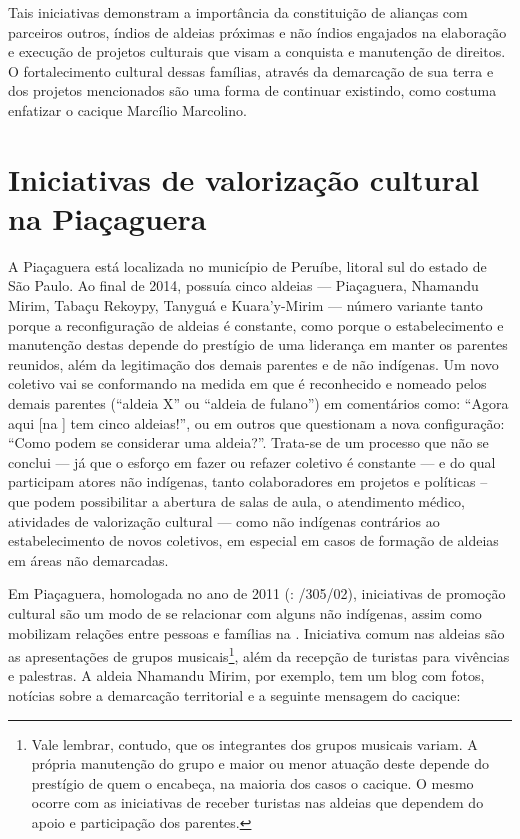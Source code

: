 Tais iniciativas demonstram a importância da constituição de alianças
com parceiros outros, índios de aldeias próximas e não índios engajados
na elaboração e execução de projetos culturais que visam a conquista e
manutenção de direitos. O fortalecimento cultural dessas famílias,
através da demarcação de sua terra e dos projetos mencionados são uma
forma de continuar existindo, como costuma enfatizar o cacique Marcílio
Marcolino.  

\section{Iniciativas de valorização cultural na  Piaçaguera}

A  Piaçaguera está localizada no município de Peruíbe, litoral sul do
estado de São Paulo. Ao final de 2014, possuía cinco aldeias —
Piaçaguera, Nhamandu Mirim, Tabaçu Rekoypy, Tanyguá e Kuara’y-Mirim —
número variante tanto porque a reconfiguração de aldeias é constante,
como porque o estabelecimento e manutenção destas depende do prestígio
de uma liderança em manter os parentes reunidos, além da legitimação
dos demais parentes e de não indígenas. Um novo coletivo vai se
conformando na medida em que é reconhecido e nomeado pelos demais
parentes (``aldeia X'' ou ``aldeia de fulano'') em comentários como: ``Agora
aqui [na ] tem cinco aldeias!'', ou em outros que questionam a nova
configuração: ``Como podem se considerar uma aldeia?''. Trata-se de um
processo que não se conclui — já que o esforço em fazer ou refazer
coletivo é constante — e do qual participam atores não indígenas, tanto
colaboradores em projetos e políticas – que podem possibilitar a
abertura de salas de aula, o atendimento médico, atividades de
valorização cultural — como não indígenas contrários ao estabelecimento
de novos coletivos, em especial em casos de formação de aldeias em
áreas não demarcadas. 

Em Piaçaguera,  homologada no ano de 2011 (: /305/02),
iniciativas de promoção cultural são um modo de se relacionar com
alguns não indígenas, assim como mobilizam relações entre pessoas e
famílias na . Iniciativa comum nas aldeias são as apresentações de
grupos musicais\footnote{Vale lembrar, contudo, que os integrantes dos
grupos musicais variam. A própria manutenção do grupo e maior ou menor
atuação deste depende do prestígio de quem o encabeça, na maioria dos
casos o cacique. O mesmo ocorre com as iniciativas de receber turistas
nas aldeias que dependem do apoio e participação dos parentes.}, além
da recepção de turistas para vivências e palestras. A aldeia Nhamandu
Mirim, por exemplo, tem um blog com fotos, notícias sobre a demarcação
territorial e a seguinte mensagem do cacique:

